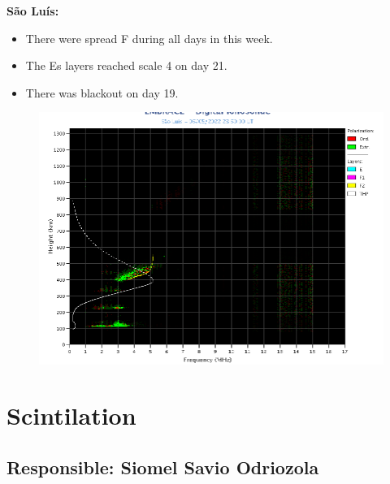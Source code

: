 \documentclass[a4paper, 10pt]{article}
\begin{document}
                     
\textbf{São Luís: }

 \begin{itemize}
\item There were spread F during all days in this week.
\item The Es layers reached scale 4 on day 21. 
\item There was blackout on day 19. 
\end{itemize}
\begin{figure}[H]
    
                        \centering
   
                             \includegraphics[width=14cm]{./figures//SãoLuís.png}

                        \end{figure}

                     
\section{Scintilation} 
 \subsection{Responsible: Siomel Savio Odriozola} 
 
\end{document}
